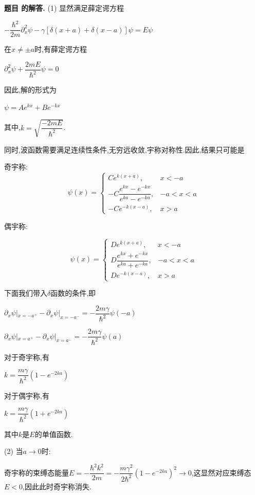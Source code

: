 \documentclass[12pt, a4paper, oneside]{ctexart}
\newcounter{problemname}
\newenvironment{solution}
  {\par\noindent\textbf{题目 \theproblemname 的解答. }}
  {\par}
\begin{document}
\begin{solution}
  (1) 显然满足薛定谔方程

  \centerline{$-\dfrac{\hbar^2}{2m}\partial_x^2 \psi - \gamma [\delta(x+a)+\delta(x-a)]\psi = E \psi$}

  在$x \neq \pm a$时,有薛定谔方程

  \centerline{$\partial_x^2 \psi + \dfrac{2mE}{\hbar^2} \psi = 0$}

  因此,解的形式为

  \centerline{$\psi = A e^{kx}+B e^{-kx}$}

  其中,$k = \sqrt{\dfrac{-2mE}{\hbar^2}}$.

  同时,波函数需要满足连续性条件,无穷远收敛,宇称对称性.因此,结果只可能是

  奇宇称:
  \[
  \psi(x) = 
  \begin{cases}
  C e^{k(x+a)}, & x < -a \\[1ex]
  - C \dfrac{e^{kx}-e^{-kx}}{e^{ka}-e^{-ka}}, & -a < x < a \\[2ex]
  - C e^{-k(x-a)}, & x > a
  \end{cases}
  \]

  偶宇称:

  \[
  \psi(x) = 
  \begin{cases}
  D e^{k(x+a)}, & x < -a \\[1ex]
  D \dfrac{e^{kx}+e^{-kx}}{e^{ka}+e^{-ka}}, & -a < x < a \\[2ex]
  D e^{-k(x-a)}, & x > a
  \end{cases}
  \]

  下面我们带入$\delta$函数的条件,即

  \centerline{$\partial_x \psi|_{x=-a^+} - \partial_x \psi|_{x=-a^-} = -\dfrac{2m\gamma}{\hbar^2}\psi(-a)$}
  \centerline{$\partial_x \psi|_{x=a^+} - \partial_x \psi|_{x=a^-} = -\dfrac{2m\gamma}{\hbar^2}\psi(a)$}

  对于奇宇称,有

  \centerline{$k = \dfrac{m\gamma}{\hbar^2}(1 - e^{-2ka})$}

  对于偶宇称,有

  \centerline{$k = \dfrac{m\gamma}{\hbar^2}(1 + e^{-2ka})$}

  其中$k$是$E$的单值函数.
  
  \newpage

  (2) 当$a \to 0$时:
  
  奇宇称的束缚态能量$E=-\dfrac{\hbar^2k^2}{2m}=-\dfrac{m\gamma^2}{2\hbar^2}(1-e^{-2ka})^2 \to 0$,这显然对应束缚态$E<0$,因此此时奇宇称消失.


\end{solution}
\end{document}
